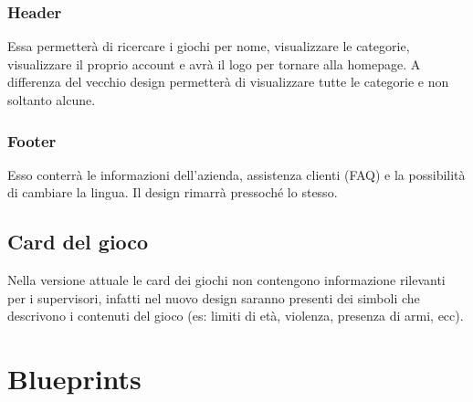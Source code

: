 \documentclass[../Report.tex]{subfiles}
\begin{document}
    \subsubsection{Header}
    Essa permetterà di ricercare i giochi per nome, visualizzare le categorie, visualizzare il proprio account e avrà il logo per tornare alla homepage. A differenza del vecchio design permetterà di visualizzare tutte le categorie e non soltanto alcune. 

    \subsubsection{Footer}
    Esso conterrà le informazioni dell'azienda, assistenza clienti (FAQ) e la possibilità di cambiare la lingua. Il design rimarrà pressoché lo stesso.
    
    \subsection{Card del gioco}
    Nella versione attuale le card dei giochi non contengono informazione rilevanti per i supervisori, infatti nel nuovo design saranno presenti dei simboli che descrivono i contenuti del gioco (es: limiti di età, violenza, presenza di armi, ecc).


    \section{Blueprints}
\end{document}
